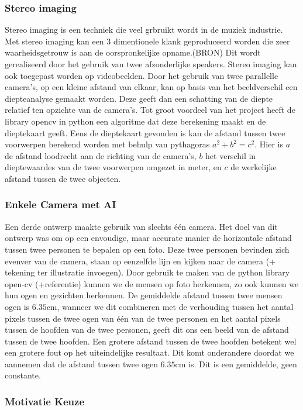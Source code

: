\documentclass[a4paper,11pt]{article}
\begin{document}
	\subsubsection{Stereo imaging}
		Stereo imaging is een techniek die veel grbruikt wordt in de muziek industrie. Met stereo imaging kan een 3 dimentionele klank geproduceerd worden die zeer waarheidsgetrouw is aan de oorspronkelijke opname.(BRON) Dit wordt gerealiseerd door het gebruik van twee afzonderlijke speakers. Stereo imaging kan ook toegepast worden op videobeelden. Door het gebruik van twee parallelle camera's, op een kleine afstand van elkaar, kan op basis van het beeldverschil een diepteanalyse gemaakt worden. Deze geeft dan een schatting van de diepte relatief ten opzichte van de camera's. Tot groot voordeel van het project heeft de library opencv in python een algoritme dat deze berekening maakt en de dieptekaart geeft. Eens de dieptekaart gevonden is kan de afstand tussen twee voorwerpen berekend worden met behulp van pythagoras $a^2+b^2=c^2 $. Hier is $a$ de afstand loodrecht aan de richting van de camera's, $b$ het verschil in dieptewaardes van de twee voorwerpen omgezet in meter, en $c$ de werkelijke afstand tussen de twee objecten.
	\subsubsection{Enkele Camera met AI}
		Een derde ontwerp maakte gebruik van slechts één camera. Het doel van dit ontwerp was om op een envoudige, maar accurate manier de horizontale afstand tussen twee personen te bepalen op een foto. Deze twee personen bevinden zich evenver van de camera, staan op eenzelfde lijn en kijken naar de camera (+ tekening ter illustratie invoegen). Door gebruik te maken van de python library open-cv (+referentie) kunnen we de mensen op foto herkennen, zo ook kunnen we hun ogen en gezichten herkennen. De gemiddelde afstand tussen twee mensen ogen is $6.35\text{cm}$, wanneer we dit combineren met de verhouding tussen het aantal pixels tussen de twee ogen van één van de twee personen en het aantal pixels tussen de hoofden van de twee personen, geeft dit ons een beeld van de afstand tussen de twee hoofden. Een grotere afstand tussen de twee hoofden betekent wel een grotere fout op het uiteindelijke resultaat. Dit komt onderandere doordat we aannemen dat de afstand tussen twee ogen $6.35\text{cm}$ is. Dit is een gemiddelde, geen constante.
	\subsubsection{Motivatie Keuze}
\end{document}
